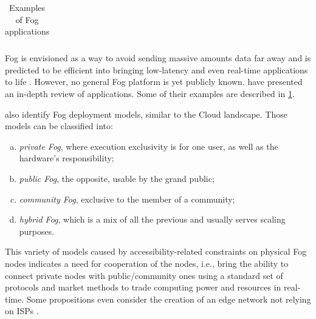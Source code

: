 \begin{table}[t]
\begin{tabular}{@{} p{3cm}|p{12cm} @{}}
		\\
		\cmidrule[1pt]{1-2}
	\end{tabular}
	\caption{Examples of Fog applications \cite{ahmed_fog_2019}}
	\label{tab:applications}
\end{table}

Fog is envisioned as a way to avoid sending massive amounts data far away and is predicted to be efficient into bringing low-latency and even real-time applications to life \cite{ahmed_fog_2019}. However, no general Fog platform is yet publicly known. \citet{ahmed_fog_2019} have presented an in-depth review of applications. Some of their examples are described in \cref{tab:applications}.

\citet{ahmed_fog_2019} also identify Fog deployment models, similar to the Cloud landscape. Those models can be classified into:
\begin{enumerate}[(a)]
	\item \emph{private Fog}, where execution exclusivity is for one user, as well as the hardware's responsibility;
	\item \emph{public Fog}, the opposite, usable by the grand public;
	\item \emph{community Fog}, exclusive to the member of a community;
	\item \emph{hybrid Fog}, which is a mix of all the previous and usually serves scaling purposes.
\end{enumerate}
This variety of models caused by accessibility-related constraints on physical Fog nodes indicates a need for cooperation of the nodes, i.e., bring the ability to connect private nodes with public/community ones using a standard set of protocols and market methods to trade computing power and resources in real-time. Some propositions even consider the creation of an edge network not relying on \glspl{ISP} \cite{bermbach_towards_2021}.


